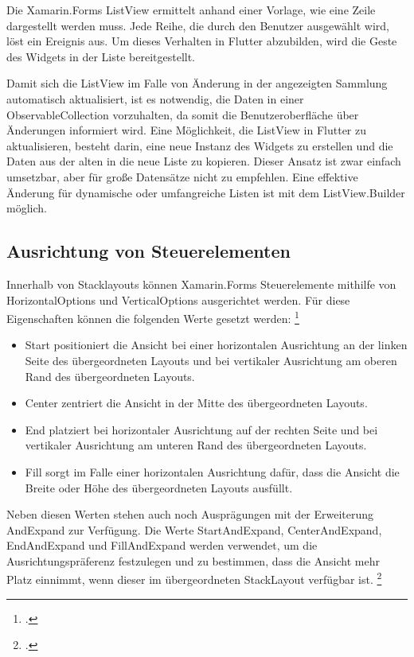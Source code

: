 Die Xamarin.Forms \glq ListView \grq{}ermittelt anhand einer Vorlage,  wie eine Zeile dargestellt werden muss.  Jede Reihe,  die durch den Benutzer ausgewählt wird,  löst ein Ereignis aus.  Um dieses Verhalten in Flutter abzubilden,  wird die Geste des Widgets in der Liste bereitgestellt.  

Damit sich die \glq ListView\grq{}  im Falle von Änderung in der angezeigten Sammlung automatisch aktualisiert, ist es notwendig,  die Daten in einer \glq ObservableCollection\grq{} vorzuhalten,  da somit die Benutzeroberfläche über Änderungen informiert wird.   Eine  Möglichkeit, die  \glq ListView\grq{} in Flutter zu aktualisieren, besteht darin, eine neue Instanz des Widgets zu erstellen und die Daten aus der alten in die neue Liste zu kopieren.  Dieser Ansatz ist zwar einfach umsetzbar, aber für große Datensätze nicht zu empfehlen.  Eine effektive Änderung für dynamische oder umfangreiche Listen ist mit dem \glq ListView.Builder\grq{}  möglich.   
 
\subsection{Ausrichtung von Steuerelementen}
Innerhalb von \glq Stacklayouts\grq{} können Xamarin.Forms Steuerelemente mithilfe von \glq HorizontalOptions\grq{} und \glq VerticalOptions\grq{}  ausgerichtet werden.  Für diese Eigenschaften können die folgenden Werte gesetzt werden: \footcite[Vgl.][Abgerufen am \today]{MicrosoftLayouts2020} 

\begin{itemize}
\setlength\itemsep{-0.6em}
 \item \glq Start\grq{} positioniert die Ansicht bei einer horizontalen Ausrichtung an der linken Seite des übergeordneten Layouts und bei vertikaler Ausrichtung am oberen Rand des übergeordneten Layouts.
  \item \glq Center\grq{} zentriert die Ansicht in der Mitte des übergeordneten Layouts.
  \item \glq End\grq{} platziert bei horizontaler Ausrichtung auf der rechten Seite und bei vertikaler Ausrichtung  am unteren Rand des übergeordneten Layouts.
  \item \glq Fill\grq{} sorgt im Falle einer horizontalen Ausrichtung dafür, dass die Ansicht die Breite oder Höhe des übergeordneten Layouts ausfüllt.
\end{itemize}
Neben diesen Werten stehen auch noch Ausprägungen mit der Erweiterung \glq AndExpand\grq{} zur Verfügung.  Die Werte \glq StartAndExpand\grq , \glq CenterAndExpand\grq , \glq EndAndExpand\grq{} und \glq FillAndExpand\grq{} werden verwendet, um die Ausrichtungspräferenz festzulegen und zu bestimmen, dass die Ansicht mehr Platz einnimmt, wenn dieser im übergeordneten \glq StackLayout\grq{} verfügbar ist. \footcite[Vgl.][Abgerufen am \today]{MicrosoftLayouts2020} 

